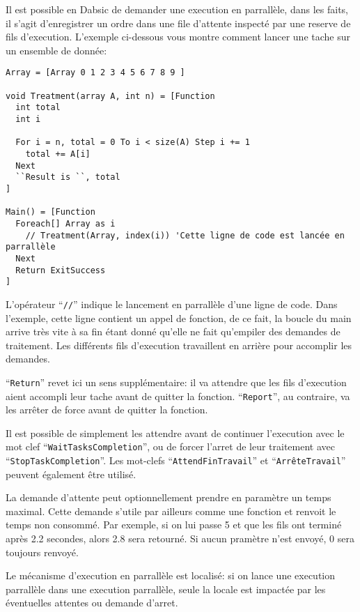 \documentclass[a5paper, 12pt]{book}
\begin{document}
Il est possible en Dabsic de demander une execution en
parrallèle, dans les faits, il s'agit d'enregistrer un ordre
dans une file d'attente inspecté par une reserve de fils
d'execution. L'exemple ci-dessous vous montre comment lancer
une tache sur un ensemble de donnée:\\

\begin{verbatim}
Array = [Array 0 1 2 3 4 5 6 7 8 9 ]

void Treatment(array A, int n) = [Function
  int total
  int i

  For i = n, total = 0 To i < size(A) Step i += 1
    total += A[i]
  Next
  ``Result is ``, total
]

Main() = [Function
  Foreach[] Array as i
    // Treatment(Array, index(i)) 'Cette ligne de code est lancée en parrallèle
  Next
  Return ExitSuccess
]
\end{verbatim}

L'opérateur ``\verb!//!'' indique le lancement en parrallèle d'une ligne de code.
Dans l'exemple, cette ligne contient un appel de fonction, de ce fait,
la boucle du main arrive très vite à sa fin étant donné qu'elle ne fait
qu'empiler des demandes de traitement. Les différents fils d'execution
travaillent en arrière pour accomplir les demandes.

``\verb!Return!'' revet ici un sens supplémentaire: il va attendre que les fils d'execution
aient accompli leur tache avant de quitter la fonction.
``\verb!Report!'', au contraire, va les arrêter de force avant de quitter la fonction.

Il est possible de simplement les attendre avant de continuer l'execution
avec le mot clef ``\verb!WaitTasksCompletion!'', ou de forcer l'arret de leur traitement
avec ``\verb!StopTaskCompletion!''. Les mot-clefs ``\verb!AttendFinTravail!'' et ``\verb!ArrêteTravail!''
peuvent également être utilisé.

La demande d'attente peut optionnellement prendre en paramètre un temps maximal.
Cette demande s'utile par ailleurs comme une fonction et renvoit le temps non
consommé. Par exemple, si on lui passe 5 et que les fils ont terminé après 2.2 secondes,
alors 2.8 sera retourné. Si aucun pramètre n'est envoyé, 0 sera toujours renvoyé.

Le mécanisme d'execution en parrallèle est localisé: si on lance une execution
parrallèle dans une execution parrallèle, seule la locale est impactée par
les éventuelles attentes ou demande d'arret.
\end{document}
